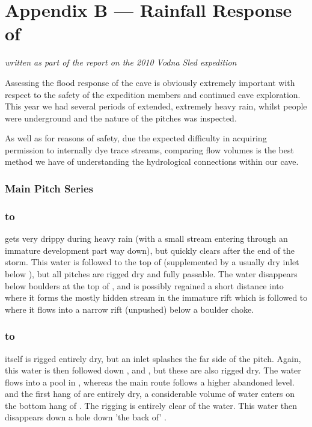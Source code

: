 \chapter{Appendix B --- Rainfall Response of }
\textit{written as part of the report on the 2010 Vodna Sled expedition}

Assessing the flood response of the cave is obviously extremely important
with respect to the safety of the expedition members and continued
cave exploration. This year we had several periods of extended, extremely
heavy rain, whilst people were underground and the nature of the pitches
was inspected.

As well as for reasons of safety, due the expected difficulty in acquiring
permission to internally dye trace streams, comparing flow volumes
is the best method we have of understanding the hydrological connections
within our cave.

\subsection{ Main Pitch Series}

\subsection{ to }

 gets very drippy during heavy rain (with a small stream entering through
an immature development part way down), but quickly clears after the end of the
storm. This water is followed to the top of  (supplemented by a usually dry
inlet below ), but all pitches are rigged dry and fully passable. 
The water disappears below boulders at the top of , and is possibly
regained a short distance into  where it forms the mostly
hidden stream in the immature rift which is followed to  where it
flows into a narrow rift (unpushed) below a boulder choke.

\subsection{ to }

 itself is rigged entirely dry, but an inlet splashes the far side of the
pitch. Again, this water is then followed down ,  and , but these
are also rigged dry. The water flows into a pool in , whereas
the main route follows a higher abandoned level.  and the first hang
of  are entirely dry, a considerable volume of water enters on the
bottom hang of . The rigging is entirely clear of the
water. This water then disappears down a hole down 'the back of' .

